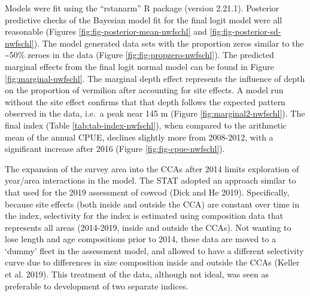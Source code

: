 \documentclass[11pt,
  english,
]{article}
\begin{document}
Models were fit using the ``rstanarm'' R package (version 2.21.1). Posterior predictive checks of the Bayesian model fit for the final logit model were all reasonable (Figures \ref{fig:fig-posterior-mean-nwfschl} and \ref{fig:fig-posterior-sd-nwfschl}). The model generated data sets with the proportion zeros similar to the \textasciitilde50\% zeroes in the data (Figure \ref{fig:fig-propzero-nwfschl}). The predicted marginal effects from the final logit normal model can be found in Figure \ref{fig:marginal-nwfschl}. The marginal depth effect represents the influence of depth on the proportion of vermilion after accounting for site effects. A model run without the site effect confirms that that depth follows the expected pattern observed in the data, i.e.~a peak near 145 m (Figure \ref{fig:marginal2-nwfschl}). The final index (Table \ref{tab:tab-index-nwfschl}), when compared to the arithmetic mean of the annual CPUE, declines slightly more from 2008-2012, with a significant increase after 2016 (Figure \ref{fig:fig-cpue-nwfschl}).

The expansion of the survey area into the CCAs after 2014 limits exploration of year/area interactions in the model. The STAT adopted an approach similar to that used for the 2019 assessment of cowcod {(Dick and He 2019)\leavevmode\tagmcend\tagstructend}. Specifically, because site effects (both inside and outside the CCA) are constant over time in the index, selectivity for the index is estimated using composition data that represents all areas (2014-2019, inside and outside the CCAs). Not wanting to lose length and age compositions prior to 2014, these data are moved to a `dummy' fleet in the assessment model, and allowed to have a different selectivity curve due to differences in size composition inside and outside the CCAs {(Keller et al. 2019)\leavevmode\tagmcend\tagstructend}. This treatment of the data, although not ideal, was seen as preferable to development of two separate indices.

\newpage
\end{document}
